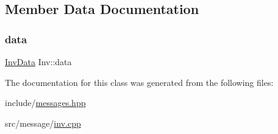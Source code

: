 \subsection{Member Data Documentation}
\mbox{\label{classInv_a6d4e11f9a1b4ff85c7afc65fc21bc4a9}} 
\subsubsection{\texorpdfstring{data}{data}}
{\footnotesize\ttfamily \mbox{\hyperlink{structInvData}{Inv\+Data}} Inv\+::data\hspace{0.3cm}{\ttfamily [private]}}



The documentation for this class was generated from the following files\+:\begin{DoxyCompactItemize}
\item 
include/\mbox{\hyperlink{messages_8hpp}{messages.\+hpp}}\item 
src/message/\mbox{\hyperlink{inv_8cpp}{inv.\+cpp}}\end{DoxyCompactItemize}
